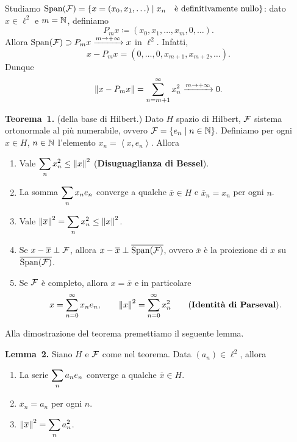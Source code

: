 Studiamo $\operatorname{Span}(\mathcal{F}) = \left\{ x = (x_0,x_1,\ldots ) \;\middle|\; x_n \quad \text{è definitivamente nullo}  \right\}$: dato $x \in \ell^2$ e $m = \mathbb N$, definiamo
%
$$
P_mx \coloneqq (x_0,x_1,\ldots , x_m,0,\ldots ).
$$
%
Allora $\operatorname{Span}(\mathcal{F}) \supset P_m x \xrightarrow{m \to +\infty} x$ in $\ell^2$.
Infatti, 
%
$$
x - P_m x = (0,\ldots ,0, x_{m+1}, x_{m+2},\ldots ).
$$
%
Dunque
%
$$
\left\lVert x - P_m x \right\rVert = \sum_{n = m+1}^{\infty} x_n^2 \xrightarrow{m \to +\infty} 0.
$$
%

\textbf{Teorema~1.} (della base di Hilbert.) Dato $H$ spazio di Hilbert, $\mathcal{F}$ sistema ortonormale al più numerabile, ovvero $\mathcal{F} = \left\{ e_n \;\middle|\; n \in \mathbb N \right\}$.
Definiamo per ogni $x \in H$, $n \in \mathbb N$ l'elemento $x_n = \left<x, e_n \right>$.
Allora
\begin{enumerate}
\item \label{item:27ott_thm1_1}
Vale $\displaystyle \sum_{n} x_n^2 \leq \left\lVert x \right\rVert^2$ (\textbf{Disuguaglianza di Bessel}).

\item \label{item:27ott_thm1_2}
La somma $\displaystyle \sum_n x_n e_n$ converge a qualche $\overline{x} \in H$ e $\overline{x}_n = x_n$  per ogni $n$.

\item \label{item:27ott_thm1_3}
Vale $\displaystyle \left\lVert \overline{x} \right\rVert^2 = \sum_n x_n^2 \leq \left\lVert x \right\rVert^2$.

\item \label{item:27ott_thm1_4}
Se $x - \overline{x} \perp \mathcal{F}$, allora $x - \overline{x} \perp \overline{\operatorname{Span}(\mathcal{F})}$, ovvero $\overline{x}$ è la proiezione di $x$ su $\overline{\operatorname{Span}(\mathcal{F})}$.

\item \label{item:27ott_thm1_5}
Se $\mathcal{F}$ è completo, allora $x = \overline{x}$ e in particolare
%
$$
x = \sum_{n=0}^{\infty} x_n e_n, \qquad \left\lVert x \right\rVert^2 = \sum_{n=0}^{\infty} x_n^2  \qquad \text{(\textbf{Identità di Parseval})}.
$$
%
\end{enumerate}



Alla dimostrazione del teorema premettiamo il seguente lemma.

\vs

\textbf{Lemma~2.} Siano $H$ e $\mathcal{F}$ come nel teorema.
Data $(a_n) \in \ell^2$, allora
\begin{enumerate}
	\item La serie $\displaystyle \sum_n a_n e_n$ converge a qualche $\overline{x} \in H$. 

	\item $\overline{x}_n = a_n$ per ogni $n$.

	\item $\displaystyle \left\lVert \overline{x} \right\rVert^2 = \sum_n a_n^2$.
\end{enumerate}

